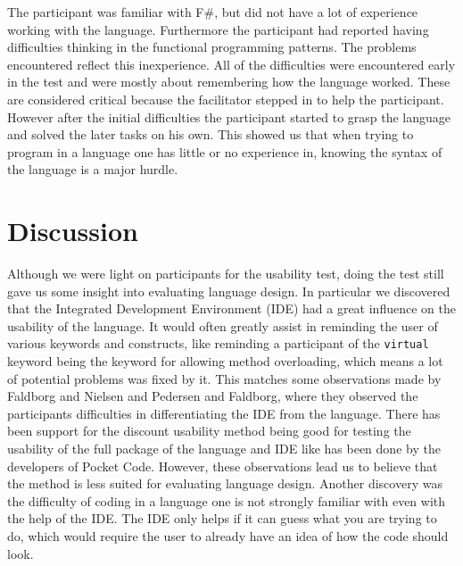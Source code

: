 The participant was familiar with F\#, but did not have a lot of experience working with the language.
Furthermore the participant had reported having difficulties thinking in the functional programming patterns.
The problems encountered reflect this inexperience.
All of the difficulties were encountered early in the test and were mostly about remembering how the language worked.
These are considered critical because the facilitator stepped in to help the participant.
However after the initial difficulties the participant started to grasp the language and solved the later tasks on his own.
This showed us that when trying to program in a language one has little or no experience in, knowing the syntax of the language is a major hurdle.

\chapter{Discussion}
Although we were light on participants for the usability test, doing the test still gave us some insight into evaluating language design.
In particular we discovered that the Integrated Development Environment (IDE) had a great influence on the usability of the language.
It would often greatly assist in reminding the user of various keywords and constructs, like reminding a participant of the \lstinline!virtual! keyword being the keyword for allowing method overloading, which means a lot of potential problems was fixed by it.
This matches some observations made by Faldborg and Nielsen \cite{DartTypeSys} and Pedersen and Faldborg\cite{LARM}, where they observed the participants difficulties in differentiating the IDE from the language. %
There has been support for the discount usability method being good for testing the usability of the full package of the language and IDE like has been done by the developers of Pocket Code\cite{PocketCode}.
However, these observations lead us to believe that the method is less suited for evaluating language design.
Another discovery was the difficulty of coding in a language one is not strongly familiar with even with the help of the IDE.
The IDE only helps if it can guess what you are trying to do, which would require the user to already have an idea of how the code should look.